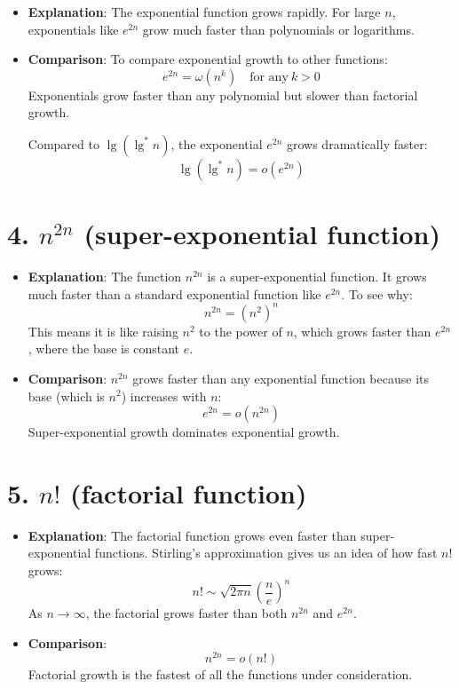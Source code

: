 \documentclass{article}
\begin{document}
\begin{itemize}
    \item \textbf{Explanation}: The exponential function grows rapidly. For large \( n \), exponentials like \( e^{2n} \) grow much faster than polynomials or logarithms.
    
    \item \textbf{Comparison}: To compare exponential growth to other functions:
    \[
    e^{2n} = \omega(n^k) \quad \text{for any} \ k > 0
    \]
    Exponentials grow faster than any polynomial but slower than factorial growth.
    
    Compared to \( \lg(\lg^*n) \), the exponential \( e^{2n} \) grows dramatically faster:
    \[
    \lg(\lg^*n) = o(e^{2n})
    \]
\end{itemize}

\section{4. \( n^{2n} \) (super-exponential function)}

\begin{itemize}
    \item \textbf{Explanation}: The function \( n^{2n} \) is a super-exponential function. It grows much faster than a standard exponential function like \( e^{2n} \). To see why:
    \[
    n^{2n} = (n^2)^n
    \]
    This means it is like raising \( n^2 \) to the power of \( n \), which grows faster than \( e^{2n} \), where the base is constant \( e \).
    
    \item \textbf{Comparison}: \( n^{2n} \) grows faster than any exponential function because its base (which is \( n^2 \)) increases with \( n \):
    \[
    e^{2n} = o(n^{2n})
    \]
    Super-exponential growth dominates exponential growth.
\end{itemize}

\section{5. \( n! \) (factorial function)}

\begin{itemize}
    \item \textbf{Explanation}: The factorial function grows even faster than super-exponential functions. Stirling's approximation gives us an idea of how fast \( n! \) grows:
    \[
    n! \sim \sqrt{2\pi n}\left(\frac{n}{e}\right)^n
    \]
    As \( n \to \infty \), the factorial grows faster than both \( n^{2n} \) and \( e^{2n} \).
    
    \item \textbf{Comparison}:
    \[
    n^{2n} = o(n!)
    \]
    Factorial growth is the fastest of all the functions under consideration.
\end{itemize}
\end{document}
